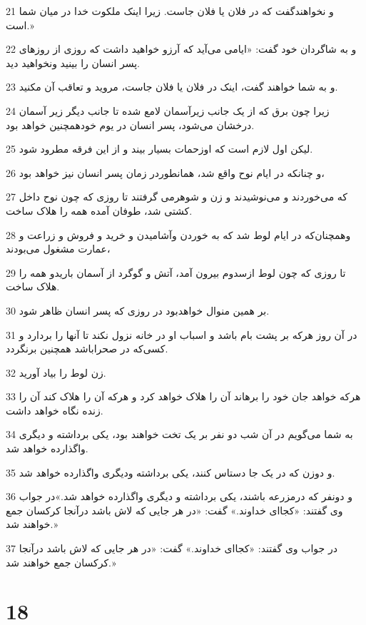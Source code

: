 \par 21 و نخواهندگفت که در فلان یا فلان جاست. زیرا اینک ملکوت خدا در میان شما است.»
\par 22 و به شاگردان خود گفت: «ایامی می‌آید که آرزو خواهید داشت که روزی از روزهای پسر انسان را بینید ونخواهید دید.
\par 23 و به شما خواهند گفت، اینک در فلان یا فلان جاست، مروید و تعاقب آن مکنید.
\par 24 زیرا چون برق که از یک جانب زیرآسمان لامع شده تا جانب دیگر زیر آسمان درخشان می‌شود، پسر انسان در یوم خودهمچنین خواهد بود.
\par 25 لیکن اول لازم است که اوزحمات بسیار بیند و از این فرقه مطرود شود.
\par 26 و چنانکه در ایام نوح واقع شد، همانطوردر زمان پسر انسان نیز خواهد بود،
\par 27 که می‌خوردند و می‌نوشیدند و زن و شوهرمی گرفتند تا روزی که چون نوح داخل کشتی شد، طوفان آمده همه را هلاک ساخت.
\par 28 وهمچنان‌که در ایام لوط شد که به خوردن وآشامیدن و خرید و فروش و زراعت و عمارت مشغول می‌بودند،
\par 29 تا روزی که چون لوط ازسدوم بیرون آمد، آتش و گوگرد از آسمان باریدو همه را هلاک ساخت.
\par 30 بر همین منوال خواهدبود در روزی که پسر انسان ظاهر شود.
\par 31 در آن روز هر‌که بر پشت بام باشد و اسباب او در خانه نزول نکند تا آنها را بردارد و کسی‌که در صحراباشد همچنین برنگردد.
\par 32 زن لوط را بیاد آورید.
\par 33 هر‌که خواهد جان خود را برهاند آن را هلاک خواهد کرد و هر‌که آن را هلاک کند آن را زنده نگاه خواهد داشت.
\par 34 به شما می‌گویم در آن شب دو نفر بر یک تخت خواهند بود، یکی برداشته و دیگری واگذارده خواهد شد.
\par 35 و دوزن که در یک جا دستاس کنند، یکی برداشته ودیگری واگذارده خواهد شد.
\par 36 و دونفر که درمزرعه باشند، یکی برداشته و دیگری واگذارده خواهد شد.»در جواب وی گفتند: «کجا‌ای خداوند.» گفت: «در هر جایی که لاش باشد درآنجا کرکسان جمع خواهند شد.»
\par 37 در جواب وی گفتند: «کجا‌ای خداوند.» گفت: «در هر جایی که لاش باشد درآنجا کرکسان جمع خواهند شد.»

\chapter{18}

